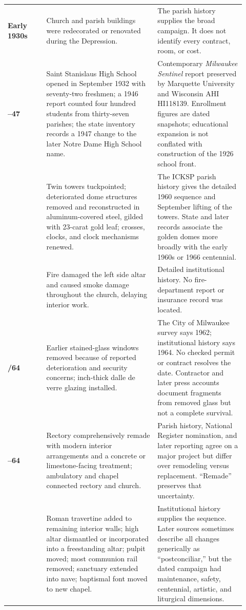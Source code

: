 \begin{longtable}{>{\bfseries\RaggedRight\arraybackslash}p{0.15\linewidth}>{\RaggedRight\arraybackslash}p{0.43\linewidth}>{\RaggedRight\arraybackslash}p{0.34\linewidth}}
Early 1930s & Church and parish buildings were redecorated or renovated during the Depression. & The parish history supplies the broad campaign. It does not identify every contract, room, or cost.\\

1932--47 & Saint Stanislaus High School opened in September 1932 with seventy-two freshmen; a 1946 report counted four hundred students from thirty-seven parishes; the state inventory records a 1947 change to the later Notre Dame High School name. & Contemporary \emph{Milwaukee Sentinel} report preserved by Marquette University and Wisconsin AHI HI118139. Enrollment figures are dated snapshots; educational expansion is not conflated with construction of the 1926 school front.\\

1960 & Twin towers tuckpointed; deteriorated dome structures removed and reconstructed in aluminum-covered steel, gilded with 23-carat gold leaf; crosses, clocks, and clock mechanisms renewed. & The ICKSP parish history gives the detailed 1960 sequence and September lifting of the towers. State and later records associate the golden domes more broadly with the early 1960s or 1966 centennial.\\

1962 & Fire damaged the left side altar and caused smoke damage throughout the church, delaying interior work. & Detailed institutional history. No fire-department report or insurance record was located.\\

1962/64 & Earlier stained-glass windows removed because of reported deterioration and security concerns; inch-thick dalle de verre glazing installed. & The City of Milwaukee survey says 1962; institutional history says 1964. No checked permit or contract resolves the date. Contractor and later press accounts document fragments from removed glass but not a complete survival.\\

1963--64 & Rectory comprehensively remade with modern interior arrangements and a concrete or limestone-facing treatment; ambulatory and chapel connected rectory and church. & Parish history, National Register nomination, and later reporting agree on a major project but differ over remodeling versus replacement. ``Remade'' preserves that uncertainty.\\

1965 & Roman travertine added to remaining interior walls; high altar dismantled or incorporated into a freestanding altar; pulpit moved; most communion rail removed; sanctuary extended into nave; baptismal font moved to new chapel. & Institutional history supplies the sequence. Later sources sometimes describe all changes generically as ``postconciliar,'' but the dated campaign had maintenance, safety, centennial, artistic, and liturgical dimensions.\\


\end{longtable}
